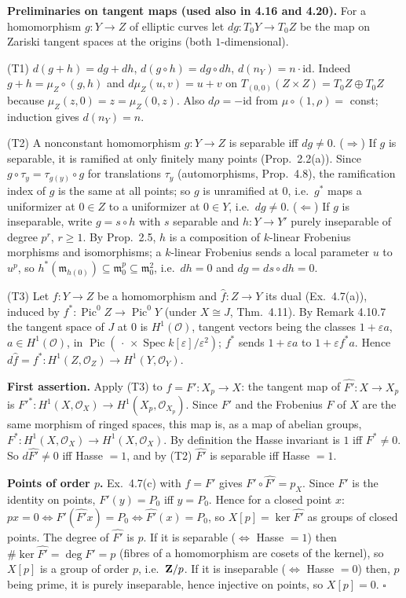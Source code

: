 \documentclass[11pt]{article}
\begin{document}
\textbf{Preliminaries on tangent maps (used also in 4.16 and 4.20).} For a homomorphism $g:Y\to Z$ of elliptic curves let $dg:T_0Y\to T_0Z$ be the map on Zariski tangent spaces at the origins (both $1$-dimensional).

(T1) $d(g+h)=dg+dh$, $d(g\circ h)=dg\circ dh$, $d(n_Y)=n\cdot\mathrm{id}$. Indeed $g+h=\mu_Z\circ(g,h)$ and $d\mu_Z(u,v)=u+v$ on $T_{(0,0)}(Z\times Z)=T_0Z\oplus T_0Z$ because $\mu_Z(z,0)=z=\mu_Z(0,z)$. Also $d\rho=-\mathrm{id}$ from $\mu\circ(1,\rho)=$ const; induction gives $d(n_Y)=n$.

(T2) A nonconstant homomorphism $g:Y\to Z$ is separable iff $dg\neq0$. ($\Rightarrow$) If $g$ is separable, it is ramified at only finitely many points (Prop.~2.2(a)). Since $g\circ\tau_y=\tau_{g(y)}\circ g$ for translations $\tau_y$ (automorphisms, Prop.~4.8), the ramification index of $g$ is the same at all points; so $g$ is unramified at $0$, i.e.\ $g^*$ maps a uniformizer at $0\in Z$ to a uniformizer at $0\in Y$, i.e.\ $dg\neq0$. ($\Leftarrow$) If $g$ is inseparable, write $g=s\circ h$ with $s$ separable and $h:Y\to Y'$ purely inseparable of degree $p^r$, $r\ge1$. By Prop.~2.5, $h$ is a composition of $k$-linear Frobenius morphisms and isomorphisms; a $k$-linear Frobenius sends a local parameter $u$ to $u^p$, so $h^*(\mathfrak m_{h(0)})\subseteq\mathfrak m_0^p\subseteq\mathfrak m_0^2$, i.e.\ $dh=0$ and $dg=ds\circ dh=0$.

(T3) Let $f:Y\to Z$ be a homomorphism and $\widehat f:Z\to Y$ its dual (Ex.~4.7(a)), induced by $f^*:\operatorname{Pic}^0Z\to\operatorname{Pic}^0Y$ (under $X\cong J$, Thm.~4.11). By Remark 4.10.7 the tangent space of $J$ at $0$ is $H^1(\mathcal O)$, tangent vectors being the classes $1+\varepsilon a$, $a\in H^1(\mathcal O)$, in $\operatorname{Pic}(\,\cdot\,\times\operatorname{Spec}k[\varepsilon]/\varepsilon^2)$; $f^*$ sends $1+\varepsilon a$ to $1+\varepsilon f^*a$. Hence $d\widehat f=f^*:H^1(Z,\mathcal O_Z)\to H^1(Y,\mathcal O_Y)$.

\textbf{First assertion.} Apply (T3) to $f=F':X_p\to X$: the tangent map of $\widehat{F'}:X\to X_p$ is $F'^*:H^1(X,\mathcal O_X)\to H^1(X_p,\mathcal O_{X_p})$. Since $F'$ and the Frobenius $F$ of $X$ are the same morphism of ringed spaces, this map is, as a map of abelian groups, $F^*:H^1(X,\mathcal O_X)\to H^1(X,\mathcal O_X)$. By definition the Hasse invariant is $1$ iff $F^*\neq0$. So $d\widehat{F'}\ne0$ iff Hasse $=1$, and by (T2) $\widehat{F'}$ is separable iff Hasse $=1$.

\textbf{Points of order $p$.} Ex.~4.7(c) with $f=F'$ gives $F'\circ\widehat{F'}=p_X$. Since $F'$ is the identity on points, $F'(y)=P_0$ iff $y=P_0$. Hence for a closed point $x$: $px=0\iff F'(\widehat{F'}x)=P_0\iff\widehat{F'}(x)=P_0$, so $X[p]=\ker\widehat{F'}$ as groups of closed points. The degree of $\widehat{F'}$ is $p$. If it is separable ($\iff$ Hasse $=1$) then $\#\ker\widehat{F'}=\deg\widehat{F'}=p$ (fibres of a homomorphism are cosets of the kernel), so $X[p]$ is a group of order $p$, i.e.\ $\mathbf Z/p$. If it is inseparable ($\iff$ Hasse $=0$) then, $p$ being prime, it is purely inseparable, hence injective on points, so $X[p]=0$. \hfill$\square$
\end{document}
